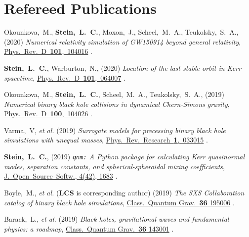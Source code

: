 \section{\sc Refereed Publications}
\addtocounter{pubCounter}{-1}
\begin{etaremune}[start=\value{pubCounter}]
\item
  Okounkova,~M.,
  {\bf Stein,~L.~C.},
  Moxon,~J.,
  Scheel,~M.~A.,
  Teukolsky,~S.~A.,
  (2020)
  {\it Numerical relativity simulation of GW150914 beyond general relativity},
  \href{https://doi.org/10.1103/PhysRevD.101.104016}{Phys.~Rev.~D~{\bf 101},~104016}
  .
\item
  {\bf Stein,~L.~C.},
  Warburton,~N.,
  (2020)
  {\it Location of the last stable orbit in Kerr spacetime},
  \href{https://doi.org/10.1103/PhysRevD.101.064007}{Phys.~Rev.~D~{\bf 101},~064007}
  .
\item
  Okounkova,~M.,
  {\bf Stein,~L.~C.},
  Scheel,~M.~A.,
  Teukolsky,~S.~A.,
  (2019)
  {\it Numerical binary black hole collisions in dynamical Chern-Simons gravity},
  \href{https://doi.org/10.1103/PhysRevD.100.104026}{Phys.~Rev.~D~{\bf 100},~104026}
  .
\item
  Varma,~V, {\it et al.}
  (2019)
  {\it Surrogate models for precessing binary black hole simulations with
  unequal masses},
  \href{https://doi.org/10.1103/PhysRevResearch.1.033015}{Phys.~Rev.~Research~{\bf 1},~033015}
  .
\item
  {\bf Stein,~L.~C.},
  (2019)
  \hspace{0.1em}
  {\it {\tt qnm:} A Python package for calculating Kerr quasinormal modes, separation constants, and spherical-spheroidal mixing coefficients},
  \href{https://doi.org/10.21105/joss.01683}{J.~Open~Source~Softw., 4(42), 1683}
  .
\item
  Boyle,~M., {\it et al.} ({\bf LCS} is corresponding author)
  (2019)
  {\it The SXS Collaboration catalog of binary black hole simulations},
  \href{https://doi.org/10.1088/1361-6382/ab34e2}{Class.~Quantum Grav.~{\bf 36} 195006}
  .
\item
  Barack,~L., {\it et al.}
  (2019)
  {\it Black holes, gravitational waves and fundamental physics: a roadmap},
  \href{https://doi.org/10.1088/1361-6382/ab0587}{Class.~Quantum Grav.~{\bf 36} 143001}
  .
\item

\end{etaremune}
